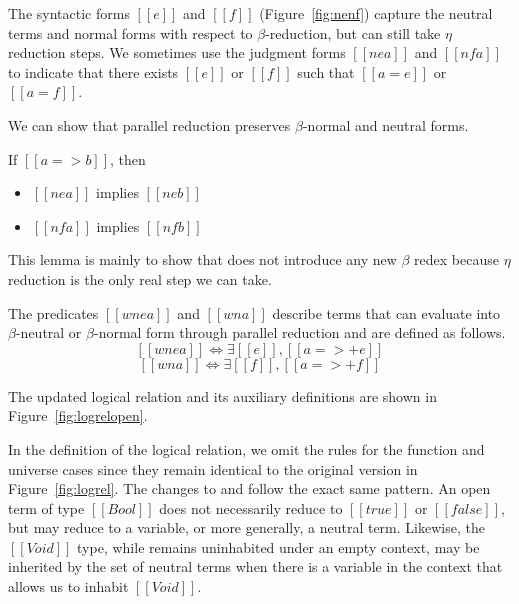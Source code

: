 \documentclass[acmsmall]{acmart}
\begin{document}
The syntactic forms $[[e]]$ and $[[f]]$ (Figure~\ref{fig:nenf}) capture the neutral terms
and normal forms with respect to $\beta$-reduction, but can still take
$\eta$ reduction steps. We sometimes use the judgment forms $[[ne a]]$
and $[[nf a]]$ to indicate that there exists $[[e]]$ or $[[f]]$ such
that $[[a = e]]$ or $[[a = f]]$.

We can show that parallel reduction preserves $\beta$-normal and
neutral forms.
\begin{lemma}
  \label{lemma:parnenf}
  If $[[a => b]]$, then
  \begin{itemize}
  \item $[[ne a]]$ implies $[[ne b]]$
  \item $[[nf a]]$ implies $[[nf b]]$
  \end{itemize}
\end{lemma}
This lemma is mainly to show that  does not introduce
any new $\beta$ redex because $\eta$ reduction is the only real step
we can take.

The predicates $[[wne a]]$ and $[[wn
a]]$ describe terms that can evaluate into $\beta$-neutral or
$\beta$-normal form through parallel reduction and are defined as
follows.
\[ [[wne a]] \iff \exists [[e]], [[a =>+ e]] \]
\[ [[wn a]] \iff \exists [[f]], [[a =>+ f]] \]

The updated logical relation and its auxiliary definitions are shown
in Figure~\ref{fig:logrelopen}.


In the definition of the logical relation, we omit the rules for
the function and universe cases since they remain identical to the
original version in Figure~\ref{fig:logrel}.
The changes to  and  follow the exact same pattern.
An open term of type $[[Bool]]$ does
not necessarily reduce to $[[true]]$ or $[[false]]$, but may reduce to
a variable, or more generally, a neutral term. Likewise, the
$[[Void]]$ type, while remains uninhabited under an empty context, may
be inherited by the set of neutral terms when there is a variable in
the context that allows us to inhabit $[[Void]]$.
\end{document}
